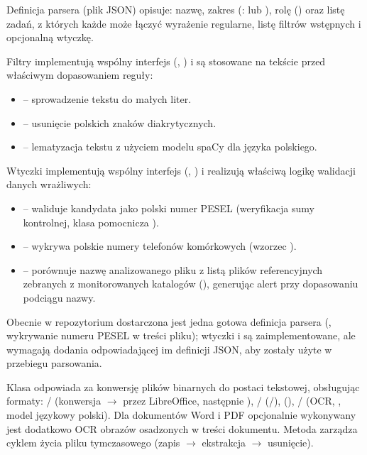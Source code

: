 Definicja parsera (plik JSON) opisuje: nazwę, zakres (:  lub
), rolę () oraz listę zadań, z których każde może łączyć wyrażenie
regularne, listę filtrów wstępnych i opcjonalną wtyczkę.


Filtry implementują wspólny interfejs  (, ) i są
stosowane na tekście przed właściwym dopasowaniem reguły:

\begin{itemize}[leftmargin=1.6em]
  \item {} -- sprowadzenie tekstu do małych liter.
  \item {} -- usunięcie polskich znaków diakrytycznych.
  \item {} -- lematyzacja tekstu z użyciem modelu spaCy dla języka polskiego.
\end{itemize}


Wtyczki implementują wspólny interfejs  (,
) i realizują właściwą logikę walidacji danych wrażliwych:

\begin{itemize}[leftmargin=1.6em]
  \item {} -- waliduje kandydata jako polski numer PESEL (weryfikacja sumy
        kontrolnej, klasa pomocnicza ).
  \item {} -- wykrywa polskie numery telefonów komórkowych (wzorzec
        ).
  \item {} -- porównuje nazwę analizowanego pliku z listą plików referencyjnych
        zebranych z monitorowanych katalogów (), generując alert
        przy dopasowaniu podciągu nazwy.
\end{itemize}

Obecnie w repozytorium dostarczona jest jedna gotowa definicja parsera
(, wykrywanie numeru PESEL w treści pliku); wtyczki
 i  są zaimplementowane, ale wymagają dodania odpowiadającej
im definicji JSON, aby zostały użyte w przebiegu parsowania.


Klasa  odpowiada za konwersję plików binarnych do postaci tekstowej, obsługując
formaty: / (konwersja $\rightarrow$ przez LibreOffice,
następnie ), / (/), 
(), / (OCR, , model językowy polski). Dla
dokumentów Word i PDF opcjonalnie wykonywany jest dodatkowo OCR obrazów osadzonych w treści
dokumentu. Metoda  zarządza cyklem życia pliku
tymczasowego (zapis $\rightarrow$ ekstrakcja $\rightarrow$ usunięcie).

